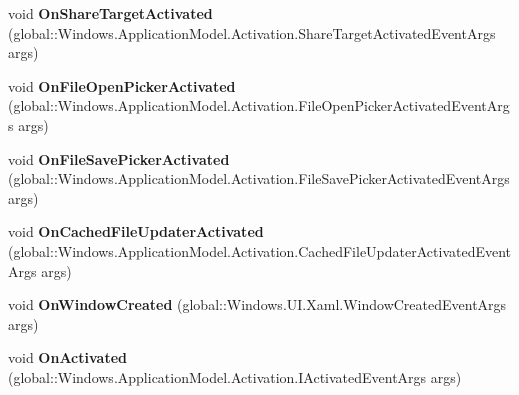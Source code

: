 \begin{DoxyCompactItemize}
\mbox{\label{interface_windows_1_1_u_i_1_1_xaml_1_1_i_application_overrides_aae46c198cf7ea67cfcbf175e03b9c9d6}} 
void {\bfseries On\+Share\+Target\+Activated} (global\+::\+Windows.\+Application\+Model.\+Activation.\+Share\+Target\+Activated\+Event\+Args args)
\item 
\mbox{\label{interface_windows_1_1_u_i_1_1_xaml_1_1_i_application_overrides_a9936f8d6d560846bd8afcc2caf52f817}} 
void {\bfseries On\+File\+Open\+Picker\+Activated} (global\+::\+Windows.\+Application\+Model.\+Activation.\+File\+Open\+Picker\+Activated\+Event\+Args args)
\item 
\mbox{\label{interface_windows_1_1_u_i_1_1_xaml_1_1_i_application_overrides_ac1045282cb352835c663f00f47f545c0}} 
void {\bfseries On\+File\+Save\+Picker\+Activated} (global\+::\+Windows.\+Application\+Model.\+Activation.\+File\+Save\+Picker\+Activated\+Event\+Args args)
\item 
\mbox{\label{interface_windows_1_1_u_i_1_1_xaml_1_1_i_application_overrides_ae742ea61ef4a57a981967d42b9269009}} 
void {\bfseries On\+Cached\+File\+Updater\+Activated} (global\+::\+Windows.\+Application\+Model.\+Activation.\+Cached\+File\+Updater\+Activated\+Event\+Args args)
\item 
\mbox{\label{interface_windows_1_1_u_i_1_1_xaml_1_1_i_application_overrides_ae5c60a74b6070b8b620b11c15d8a0d1e}} 
void {\bfseries On\+Window\+Created} (global\+::\+Windows.\+U\+I.\+Xaml.\+Window\+Created\+Event\+Args args)
\item 
\mbox{\label{interface_windows_1_1_u_i_1_1_xaml_1_1_i_application_overrides_a3d67b84df0aa6c2353ba9dfdf0711d43}} 
void {\bfseries On\+Activated} (global\+::\+Windows.\+Application\+Model.\+Activation.\+I\+Activated\+Event\+Args args)
\item 
\mbox{\label{interface_windows_1_1_u_i_1_1_xaml_1_1_i_application_overrides_ab33b8fe098161d6f117c096208d4caa4}} 

\end{DoxyCompactItemize}
